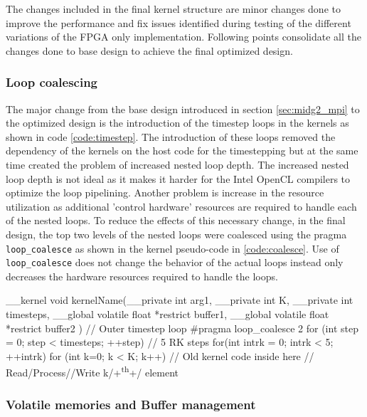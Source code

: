 The changes included in the final kernel structure are minor changes done to improve the performance
and fix issues identified during testing of the different variations of the FPGA only implementation.
Following points consolidate all the changes done to base design to achieve the final optimized
design.

\subsubsection*{Loop coalescing}

The major change from the base design introduced in section \ref{sec:midg2_mpi} to the
optimized design is the introduction of the timestep loops in the kernels as shown in
code \ref{code:timestep}. The introduction of these loops removed the dependency of the kernels
on the host code for the timestepping but at the same time created the problem of increased
nested loop depth. The increased nested loop depth is not ideal as it makes it harder
for the Intel OpenCL compilers to optimize the loop pipelining. Another problem is
increase in the resource utilization as additional 'control hardware' resources are
required to handle each of the nested loops. To reduce the effects of this necessary
change, in the final design, the top two levels of the nested loops were coalesced
using the pragma \texttt{loop\_coalesce} as shown in the kernel pseudo-code in \ref{code:coalesce}.
Use of \texttt{loop\_coalesce} does not change the behavior of the actual loops instead
only decreases the hardware resources required to handle the loops.
\begin{CppCode}[caption=Loop coalescing used for additional timestep loops in FPGA only design, frame=tlrb, label=code:coalesce, float]
__kernel void kernelName(__private int arg1,
                            __private int K,
                            __private int timesteps,
                            __global volatile float  *restrict buffer1,
                            __global volatile float  *restrict buffer2
                        )
{
    // Outer timestep loop
    #pragma loop_coalesce 2
    for (int step = 0; step < timesteps; ++step)
    {
        // 5 RK steps
        for(int intrk = 0; intrk < 5; ++intrk)
        {
            for (int k=0; k < K; k++)
            {
                // Old kernel code inside here
                // Read/Process//Write k/+\textsuperscript{th}+/ element
            }
        }
    }
}
\end{CppCode}

\subsubsection*{Volatile memories and Buffer management}

